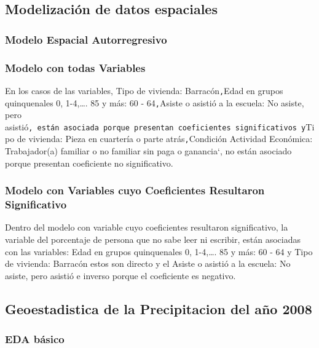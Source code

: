 \documentclass[11pt,]{article}
\begin{document}
\subsection{Modelización de datos
espaciales}\label{modelizaciuxf3n-de-datos-espaciales}

\subsubsection{Modelo Espacial
Autorregresivo}\label{modelo-espacial-autorregresivo}

\subsubsection{Modelo con todas
Variables}\label{modelo-con-todas-variables}

En los casos de las variables, Tipo de vivienda: Barracón\texttt{,}Edad
en grupos quinquenales 0, 1-4,\ldots{}. 85 y más: 60 -
64\texttt{,}Asiste o asistió a la escuela: No asiste, pero
asistió\texttt{,\ están\ asociada\ porque\ presentan\ coeficientes\ significativos\ y}Tipo
de vivienda: Pieza en cuartería o parte atrás\texttt{,}Condición
Actividad Económica: Trabajador(a) familiar o no familiar sin paga o
ganancia`, no están asociado porque presentan coeficiente no
significativo.

\subsubsection{Modelo con Variables cuyo Coeficientes Resultaron
Significativo}\label{modelo-con-variables-cuyo-coeficientes-resultaron-significativo}

Dentro del modelo con variable cuyo coeficientes resultaron
significativo, la variable del porcentaje de persona que no sabe leer ni
escribir, están asociadas con las variables: Edad en grupos quinquenales
0, 1-4,\ldots{}. 85 y más: 60 - 64 y Tipo de vivienda: Barracón estos
son directo y el Asiste o asistió a la escuela: No asiste, pero asistió
e inverso porque el coeficiente es negativo.

\subsection{Geoestadistica de la Precipitacion del año
2008}\label{geoestadistica-de-la-precipitacion-del-auxf1o-2008}

\subsubsection{EDA básico}\label{eda-buxe1sico}
\end{document}
